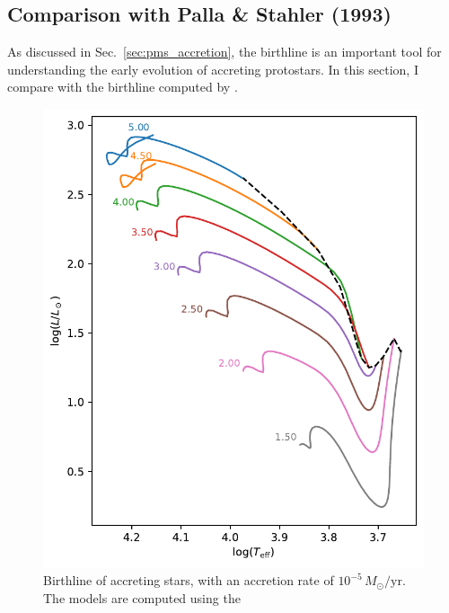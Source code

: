 \documentclass[12pt,a4paper]{article}
\newcommand{\mr}{\mathrm}
\begin{document}
\subsection{Comparison with Palla \& Stahler (1993)}
\label{sec:comp_palla_stahler}

As discussed in Sec.~\ref{sec:pms_accretion}, the birthline is an important tool for understanding the early evolution of accreting protostars. In this section, I compare with the birthline computed by \textcite{PallaStahler1993}. 

\begin{figure}
  \centering  
  \includegraphics[width=.65\textwidth,keepaspectratio]{birthline_acce5.pdf}
  \caption{Birthline of accreting stars, with an accretion rate of $10^{-5}\,M_\odot/\mr{yr}$. The models are computed using the } \label{fig:birthline_acce5}
\end{figure}


\end{document}
